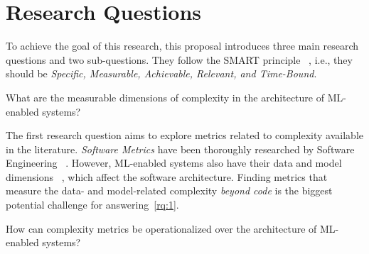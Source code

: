   
  
  \section{Research Questions}
  \label{sec:research_questions}

  To achieve the goal of this research, this proposal introduces three main
  research questions and two sub-questions. They follow the SMART principle%
  ~\parencite{Verschuren2010DesigningDesign}, i.e., they should be
  \emph{Specific, Measurable, Achievable, Relevant, and Time-Bound}.

  \begin{researchquestion}
    What are the measurable dimensions of complexity in
    the architecture of ML-enabled systems?
  \end{researchquestion}

  The first research question aims to explore metrics related to
  complexity available in the literature. \emph{Software Metrics}
  have been thoroughly researched by Software Engineering%
  ~\parencite{Fenton2014SoftwareEdition}.
  However, ML-enabled systems also have their data and model dimensions%
  ~\parencite{Alves2024PracticesReview,Sato2005RNAFields},
  which affect the software architecture.
  Finding metrics that measure the data- and model-related complexity 
  \emph{beyond code} is the biggest potential challenge for
  answering~\cref{rq:1}.

  \begin{researchquestion}
    How can complexity metrics be operationalized over
    the architecture of ML-enabled systems?
  \end{researchquestion}

